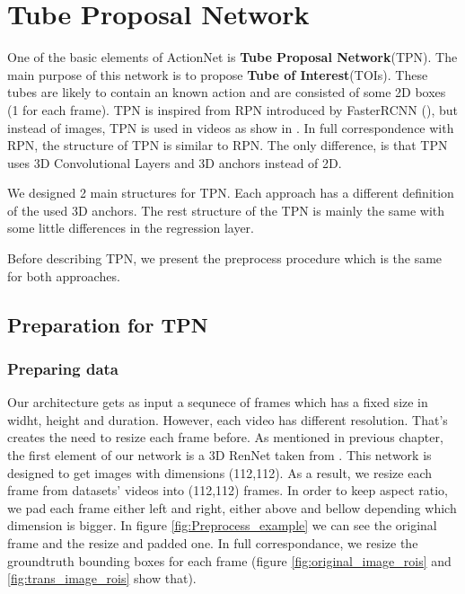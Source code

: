 \documentclass{report}
\begin{document}
\chapter{Tube Proposal Network}

One of the basic elements of ActionNet is \textbf{Tube Proposal Network}(TPN). The main purpose of this network is to propose
\textbf{Tube of Interest}(TOIs). These tubes are likely to contain an known action and are consisted of some 2D boxes
(1 for each frame). TPN is inspired from RPN introduced by FasterRCNN (\cite{Ren:2015:FRT:2969239.2969250}), but instead of images, TPN
is used in videos as show in \cite{DBLP:journals/corr/HouCS17}. In full correspondence with RPN, the structure
of TPN is similar to RPN. The only difference, is that TPN uses 3D Convolutional Layers and 3D anchors instead of 2D. \par
We designed 2 main structures for TPN. Each approach has a different definition of the used 3D anchors.
The rest structure of the TPN is mainly the same with some little differences in the regression layer. \par
Before describing TPN, we present the preprocess procedure which is the same for both approaches.

\section{Preparation for TPN}

\subsection{Preparing data}

Our architecture gets as input a sequnece of frames which has a fixed size in widht, height and duration. However, each video has different resolution. That's creates the
need to resize each frame before. As mentioned in previous chapter, the first element of our network is a 3D RenNet taken from \cite{hara3dcnns}. This network is designed to
get images with dimensions (112,112). As a result, we resize each frame from datasets' videos into (112,112) frames. In order to keep aspect ratio, we pad each frame either
left and right, either above and bellow depending which dimension is bigger. In figure  \ref{fig:Preprocess_example} we can see the original frame and the resize and padded one.
In full correspondance, we resize the groundtruth bounding boxes for each frame (figure \ref{fig:original_image_rois} and \ref{fig:trans_image_rois} show that).
\end{document}
